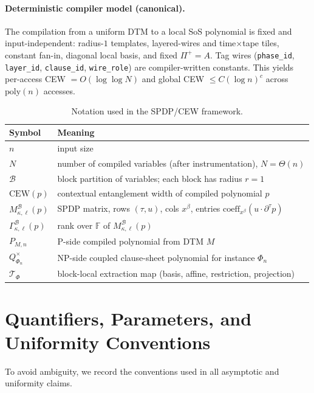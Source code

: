 \documentclass[12pt]{article}
\theoremstyle{definition}
\theoremstyle{definition}
\theoremstyle{remark}
\theoremstyle{remark}
\begin{document}
\paragraph{Deterministic compiler model (canonical).}
The compilation from a uniform DTM to a local SoS polynomial is fixed and input-independent: radius-$1$ templates, layered-wires and time$\times$tape tiles, constant fan-in, diagonal local basis, and fixed $\Pi^+=A$. Tag wires (\texttt{phase\_id}, \texttt{layer\_id}, \texttt{clause\_id}, \texttt{wire\_role}) are compiler-written constants. This yields per-access CEW $=O(\log\log N)$ and global CEW $\le C(\log n)^c$ across $\mathrm{poly}(n)$ accesses.

\begin{table}[h]
\centering
\begin{tabular}{ll}
\toprule
Symbol & Meaning \\
\midrule
$n$ & input size \\
$N$ & number of compiled variables (after instrumentation), $N=\Theta(n)$ \\
$\mathcal{B}$ & block partition of variables; each block has radius $r=1$ \\
$\mathrm{CEW}(p)$ & contextual entanglement width of compiled polynomial $p$ \\
$M_{\kappa,\ell}^{\mathcal{B}}(p)$ & SPDP matrix, rows $(\tau,u)$, cols $x^\beta$, entries $\mathrm{coeff}_{x^\beta}(u\cdot \partial^\tau p)$ \\
$\Gamma_{\kappa,\ell}^{\mathcal{B}}(p)$ & rank over $\mathbb{F}$ of $M_{\kappa,\ell}^{\mathcal{B}}(p)$ \\
$P_{M,n}$ & P-side compiled polynomial from DTM $M$ \\
$Q^{\times}_{\Phi_n}$ & NP-side coupled clause-sheet polynomial for instance $\Phi_n$ \\
$\mathcal{T}_\Phi$ & block-local extraction map (basis, affine, restriction, projection) \\
\bottomrule
\end{tabular}
\caption{Notation used in the SPDP/CEW framework.}
\label{tab:notation}
\end{table}

\section{Quantifiers, Parameters, and Uniformity Conventions}
\label{sec:quantifiers}

To avoid ambiguity, we record the conventions used in all asymptotic and
uniformity claims.
\end{document}

